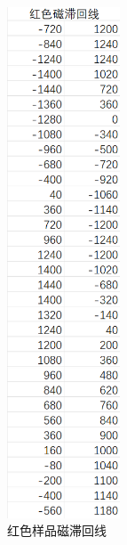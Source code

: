\documentclass{ctexart}
\begin{document}
\begin{figure}[H]
  \begin{minipage}[t]{0.45\textwidth}
    \centering
    \includegraphics[width=0.3\textwidth,height=0.8\textheight]{hongseqvxianshujv.png}
    \caption{红色样品磁滞回线}
    \label{hongseshujv}
  \end{minipage}
  \begin{minipage}[t]{0.45\textwidth}
    \centering

\end{minipage}
\end{figure}
\end{document}

